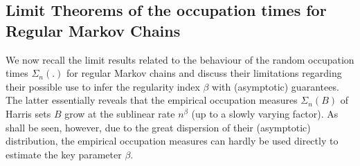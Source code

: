 \documentclass[sn-mathphys-ay]{sn-jnl}%
\newtheorem{theorem}{Theorem}[section]%
\begin{document}
\subsection{Limit Theorems of the occupation times for Regular Markov Chains}\label{subsec:limit}

We now recall the limit results related to the behaviour of the random occupation times
$\Sigma_n(.)$ for regular Markov chains and discuss their limitations regarding their
possible use to infer the regularity index $\beta$ with (asymptotic) guarantees. The
latter essentially reveals that the empirical occupation measures $\Sigma_n(B)$ of Harris
sets $B$ grow at the sublinear rate $n^{\beta}$ (up to a slowly varying factor). As shall
be seen, however, due to the great dispersion of their (asymptotic) distribution, the
empirical occupation measures can hardly be used directly to estimate the key parameter
$\beta$.


\end{document}
